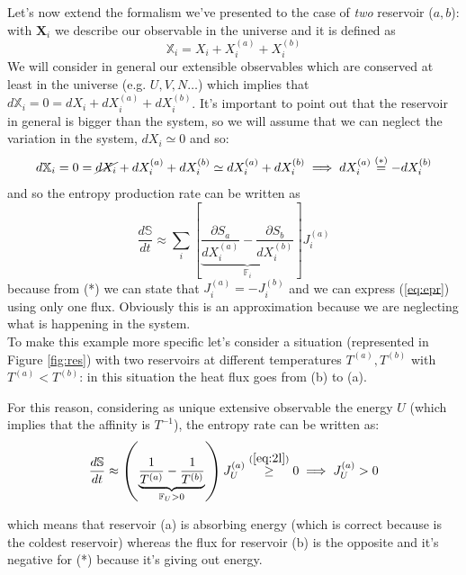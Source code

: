 \documentclass[\main/main.tex]{subfiles}
\begin{document}
Let's now extend the formalism we've presented to the case of \textit{two} reservoir ($a,b$): with $\mathbf{X}_i$ we describe our observable in the universe and it is defined as
\begin{equation}
    \mathbb{X}_i=X_i + X_i^{(a)} + X_i^{(b)}
\end{equation}
We will consider in general our extensible observables which are conserved at least in the universe (e.g. $U,V,N \dots$) which implies that $d\mathbb{X}_i=0=dX_i + dX_i^{(a)} + dX_i^{(b)}$. It's important to point out that the reservoir in general is bigger than the system, so we will assume that we can neglect the variation in the system, $dX_i\simeq 0$ and  so:
\begin{equation}
    d\mathbb{X}_i = 0 = \cancel{dX_i} + dX_i^{(a)} + dX_i^{(b)} \simeq  dX_i^{(a)} + dX_i^{(b)} \implies  dX_i^{(a)} \overset{(*)}{=} - dX_i^{(b)}
\end{equation}
and so the entropy production rate can be written as
\begin{equation}
    \frac{d\mathbb{S}}{dt}\approx \sum_i \left[ \underbrace{\frac{\partial S_a}{ dX_i^{(a)}} - \frac{\partial S_b}{ dX_i^{(b)}}}_{\mathbb{F}_i} \right]J_i^{(a)}
    \label{eq:epr}
\end{equation}
because from (*) we can state that $J_i^{(a)}=-J_i^{(b)}$ and we can express (\ref{eq:epr}) using only one flux. Obviously this is an approximation because we are neglecting what is happening in the system. \\

To make this example more specific let's consider a situation (represented in Figure \ref{fig:res}) with two reservoirs  at different temperatures $T^{(a)},T^{(b)}$ with $T^{(a)}<T^{(b)}$: in this situation the heat flux goes from (b) to (a).

For this reason, considering as unique extensive observable the energy $U$ (which implies that the affinity is $T^{-1}$), the entropy rate can be written as:
\begin{equation}
    \frac{d\mathbb{S}}{dt}\approx\left(\underbrace{\frac{1}{T^{(a)}} - \frac{1}{T^{(b)}}}_{\mathbb{F}_U>0}\right)J_U^{(a)} \overset{(\ref{eq:2l})}{\geq} 0 \implies J_U^{(a)} > 0
\end{equation}

which means that reservoir (a) is absorbing energy (which is correct because is the coldest reservoir) whereas the flux for reservoir (b) is the opposite and it's negative for (*) because it's giving out energy. 
\end{document}
